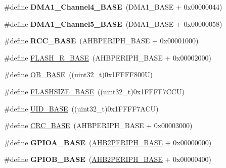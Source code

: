 \begin{DoxyCompactItemize}
\#define {\bfseries D\+M\+A1\+\_\+\+Channel4\+\_\+\+B\+A\+SE}~(D\+M\+A1\+\_\+\+B\+A\+SE + 0x00000044)
\item 
\mbox{\label{group___peripheral__memory__map_gac041a71cd6c1973964f847a68aa14478}} 
\#define {\bfseries D\+M\+A1\+\_\+\+Channel5\+\_\+\+B\+A\+SE}~(D\+M\+A1\+\_\+\+B\+A\+SE + 0x00000058)
\item 
\mbox{\label{group___peripheral__memory__map_ga0e681b03f364532055d88f63fec0d99d}} 
\#define {\bfseries R\+C\+C\+\_\+\+B\+A\+SE}~(A\+H\+B\+P\+E\+R\+I\+P\+H\+\_\+\+B\+A\+SE + 0x00001000)
\item 
\#define \hyperlink{group___peripheral__memory__map_ga8e21f4845015730c5731763169ec0e9b}{F\+L\+A\+S\+H\+\_\+\+R\+\_\+\+B\+A\+SE}~(A\+H\+B\+P\+E\+R\+I\+P\+H\+\_\+\+B\+A\+SE + 0x00002000)
\item 
\#define \hyperlink{group___peripheral__memory__map_gab5b5fb155f9ee15dfb6d757da1adc926}{O\+B\+\_\+\+B\+A\+SE}~((uint32\+\_\+t)0x1\+F\+F\+F\+F800\+U)
\item 
\#define \hyperlink{group___peripheral__memory__map_ga776d985f2d4d40b588ef6ca9d573af78}{F\+L\+A\+S\+H\+S\+I\+Z\+E\+\_\+\+B\+A\+SE}~((uint32\+\_\+t)0x1\+F\+F\+F\+F7\+C\+C\+U)
\item 
\#define \hyperlink{group___peripheral__memory__map_ga664eda42b83c919b153b07b23348be67}{U\+I\+D\+\_\+\+B\+A\+SE}~((uint32\+\_\+t)0x1\+F\+F\+F\+F7\+A\+C\+U)
\item 
\#define \hyperlink{group___peripheral__memory__map_ga656a447589e785594cbf2f45c835ad7e}{C\+R\+C\+\_\+\+B\+A\+SE}~(A\+H\+B\+P\+E\+R\+I\+P\+H\+\_\+\+B\+A\+SE + 0x00003000)
\item 
\mbox{\label{group___peripheral__memory__map_gad7723846cc5db8e43a44d78cf21f6efa}} 
\#define {\bfseries G\+P\+I\+O\+A\+\_\+\+B\+A\+SE}~(\hyperlink{group___peripheral__memory__map_gaeedaa71d22a1948492365e2cd26cfd46}{A\+H\+B2\+P\+E\+R\+I\+P\+H\+\_\+\+B\+A\+SE} + 0x00000000)
\item 
\mbox{\label{group___peripheral__memory__map_gac944a89eb789000ece920c0f89cb6a68}} 
\#define {\bfseries G\+P\+I\+O\+B\+\_\+\+B\+A\+SE}~(\hyperlink{group___peripheral__memory__map_gaeedaa71d22a1948492365e2cd26cfd46}{A\+H\+B2\+P\+E\+R\+I\+P\+H\+\_\+\+B\+A\+SE} + 0x00000400)
\item 

\end{DoxyCompactItemize}

